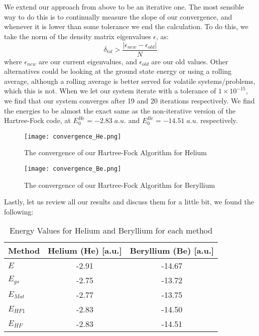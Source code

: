 \documentclass{article}
\begin{document}
\section{}
We extend our approach from above to be an iterative one. The most sensible way to do this is to continually measure the slope of our convergence, and whenever it is lower than some tolerance we end the calculation. \newline
To do this, we take the norm of the density matrix eigenvalues $\epsilon$, as:
\begin{equation*}
    \delta_{tol} > \frac{|\epsilon_{new} - \epsilon_{old}|}{N}
\end{equation*}
where $\epsilon_{new}$ are our current eigenvalues, and $\epsilon_{old}$ are our old values. Other alternatives could be looking at the ground state energy or using a rolling average, although a rolling average is better served for volatile systems/problems, which this is not.
\newline
When we let our system iterate with a tolerance of $1 \times 10^{-15}$, we find that our system converges after 19 and 20 iterations respectively. We find the energies to be almost the exact same as the non-iterative version of the Hartree-Fock code, at $E_0^{He} = -2.83\;a.u.$ and $E_0^{Be} = -14.51 \;a.u.$ respectively.
\newline
\begin{figure}[ht!]
    \centering
    \texttt{[image: convergence\_He.png]}
    \caption{The convergence of our Hartree-Fock Algorithm for Helium}
    \label{fig:enter-label}
\end{figure}
\begin{figure}[ht!]
    \centering
    \texttt{[image: convergence\_Be.png]}
    \caption{The convergence of our Hartree-Fock Algorithm for Beryllium}
    \label{fig:enter-label}
\end{figure}
\newpage
Lastly, let us review all our results and discuss them for a little bit, we found the following:
\begin{table}[h!]
    \centering
    \caption{Energy Values for Helium and Beryllium for each method}
    \begin{tabular}{@{}lcc@{}}
        \toprule
        Method & Helium (He) [a.u.] & Beryllium (Be) [a.u.] \\ \midrule
        $E$         & -2.91     & -14.67    \\
        $E_{gs}$    & -2.75     & -13.72    \\
        $E_{Mat}$   & -2.77     & -13.75    \\
        $E_{HF1}$   & -2.83     & -14.50    \\
        $E_{HF}$    & -2.83     & -14.51    \\ \bottomrule
    \end{tabular}
    \label{tab:energy_values}
\end{table}
\end{document}
